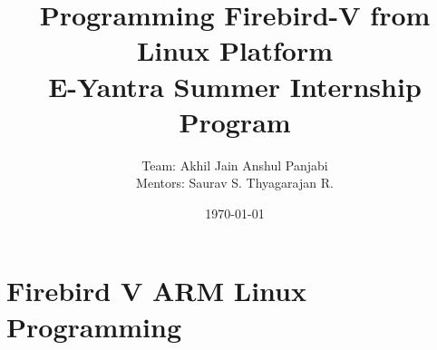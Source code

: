 \documentclass[20pt]{report}
\begin{document}
\title{\textbf{\LARGE{Programming Firebird-V from Linux Platform} \vspace{0.3in} \\  E-Yantra Summer Internship  Program}}
\author{Team:\hspace{0.1in} Akhil Jain \hspace{0.2in} Anshul Panjabi \\ \vspace{0.2in}  Mentors: \vspace{0.05in} Saurav S. \hspace{0.2in} Thyagarajan R.}

\date{\today}

\maketitle

\newpage
\chapter{Firebird V ARM Linux Programming}
\end{document}
